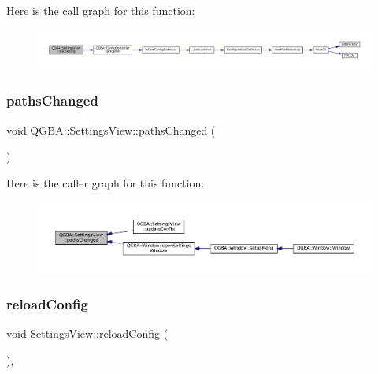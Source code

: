 Here is the call graph for this function\+:
\nopagebreak
\begin{figure}[H]
\begin{center}
\leavevmode
\includegraphics[width=350pt]{class_q_g_b_a_1_1_settings_view_a40b5c189d40375908f5ff441898ea7a9_cgraph}
\end{center}
\end{figure}
\mbox{\label{class_q_g_b_a_1_1_settings_view_abae5daca6c49f303db87bd0b46f42528}} 
\subsubsection{\texorpdfstring{paths\+Changed}{pathsChanged}}
{\footnotesize\ttfamily void Q\+G\+B\+A\+::\+Settings\+View\+::paths\+Changed (\begin{DoxyParamCaption}{ }\end{DoxyParamCaption})\hspace{0.3cm}{\ttfamily [signal]}}

Here is the caller graph for this function\+:
\nopagebreak
\begin{figure}[H]
\begin{center}
\leavevmode
\includegraphics[width=350pt]{class_q_g_b_a_1_1_settings_view_abae5daca6c49f303db87bd0b46f42528_icgraph}
\end{center}
\end{figure}
\mbox{\label{class_q_g_b_a_1_1_settings_view_a9e9647e7a375c5e48d501966fa316a15}} 
\subsubsection{\texorpdfstring{reload\+Config}{reloadConfig}}
{\footnotesize\ttfamily void Settings\+View\+::reload\+Config (\begin{DoxyParamCaption}{ }\end{DoxyParamCaption})\hspace{0.3cm}{\ttfamily [private]}, {\ttfamily [slot]}}

